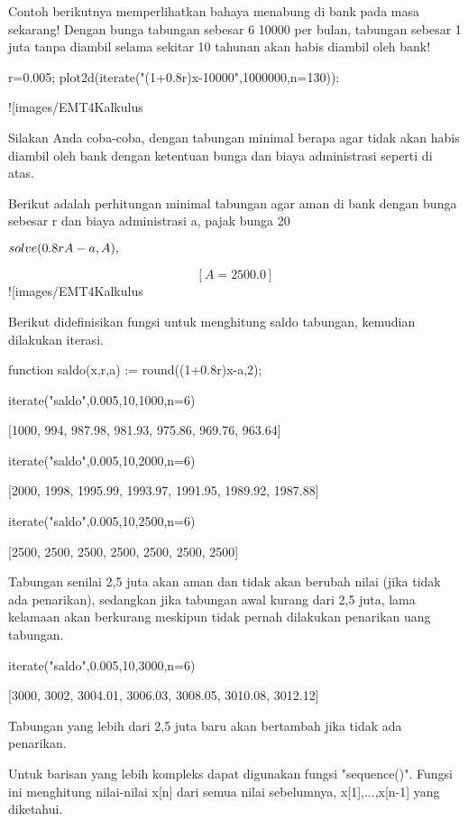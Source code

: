 \documentclass{article}
\begin{document}
Contoh berikutnya memperlihatkan bahaya menabung di bank pada masa sekarang! Dengan bunga
tabungan sebesar 6%
10000 per bulan, tabungan sebesar 1 juta tanpa diambil selama sekitar 10 tahunan akan habis
diambil oleh bank!


\>r=0.005; plot2d(iterate("(1+0.8\*r)\*x-10000",1000000,n=130)):


![images/EMT4Kalkulus%

Silakan Anda coba-coba, dengan tabungan minimal berapa agar tidak akan habis diambil oleh
bank dengan ketentuan bunga dan biaya administrasi seperti di atas.


Berikut adalah perhitungan minimal tabungan agar aman di bank dengan bunga sebesar r dan
biaya administrasi a, pajak bunga 20%


\>$solve(0.8\*r\*A-a,A), $%


$$\left[ A=2500.0 \right] $$![images/EMT4Kalkulus%

Berikut didefinisikan fungsi untuk menghitung saldo tabungan, kemudian dilakukan iterasi.


\>function saldo(x,r,a) := round((1+0.8\*r)\*x-a,2);

\>iterate({{"saldo",0.005,10}},1000,n=6)


    [1000,  994,  987.98,  981.93,  975.86,  969.76,  963.64]

\>iterate({{"saldo",0.005,10}},2000,n=6)


    [2000,  1998,  1995.99,  1993.97,  1991.95,  1989.92,  1987.88]

\>iterate({{"saldo",0.005,10}},2500,n=6)


    [2500,  2500,  2500,  2500,  2500,  2500,  2500]

Tabungan senilai 2,5 juta akan aman dan tidak akan berubah nilai (jika tidak ada penarikan),
sedangkan jika tabungan awal kurang dari 2,5 juta, lama kelamaan akan berkurang meskipun
tidak pernah dilakukan penarikan uang tabungan.


\>iterate({{"saldo",0.005,10}},3000,n=6)


    [3000,  3002,  3004.01,  3006.03,  3008.05,  3010.08,  3012.12]

Tabungan yang lebih dari 2,5 juta baru akan bertambah jika tidak ada
penarikan.


Untuk barisan yang lebih kompleks dapat digunakan fungsi "sequence()".
Fungsi ini menghitung nilai-nilai x[n] dari semua nilai sebelumnya,
x[1],...,x[n-1] yang diketahui.
\end{document}
